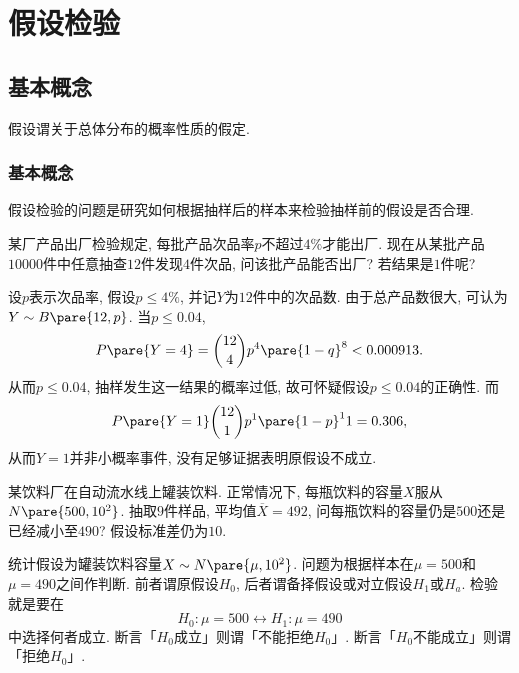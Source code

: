 \documentclass{ctexart}
\begin{document}
\section{假设检验} %
\label{sec:假设检验}

\subsection{基本概念} %
\label{sub:基本概念}

假设谓关于总体分布的概率性质的假定.

\subsubsection{基本概念} %
\label{ssub:基本概念}

假设检验的问题是研究如何根据抽样后的样本来检验抽样前的假设是否合理.
\begin{sample}
    \begin{ex}
        某厂产品出厂检验规定, 每批产品次品率$p$不超过$4\%$才能出厂. 现在从某批产品$10000$件中任意抽查$12$件发现$4$件次品, 问该批产品能否出厂? 若结果是$1$件呢?
    \end{ex}
    \begin{solution}
        设$p$表示次品率, 假设$p\le 4\%$, 并记$Y$为$12$件中的次品数. 由于总产品数很大, 可认为$Y\sim B\pare{12,p}$. 当$p\le 0.04$,
        \[ P\pare{Y=4} = \binom{12}{4} p^4\pare{1-q}^8 < 0.000913. \]
        从而$p\le 0.04$, 抽样发生这一结果的概率过低, 故可怀疑假设$p\le 0.04$的正确性. 而
        \[ P\pare{Y=1} \binom{12}{1}p^1\pare{1-p}^11 = 0.306, \]
        从而$Y=1$并非小概率事件, 没有足够证据表明原假设不成立.
    \end{solution}
\end{sample}
\begin{sample}
    \begin{ex}
        某饮料厂在自动流水线上罐装饮料. 正常情况下, 每瓶饮料的容量$X$服从$N\pare{500,10^2}$. 抽取$9$件样品, 平均值$\overbar{X} = 492$, 问每瓶饮料的容量仍是$500$还是已经减小至$490$? 假设标准差仍为$10$.
    \end{ex}
\end{sample}
统计假设为罐装饮料容量$X\sim N\pare{\mu,10^2}$. 问题为根据样本在$\mu=500$和$\mu=490$之间作判断. 前者谓原假设$H_0$, 后者谓备择假设或对立假设$H_1$或$H_a$. 检验就是要在
\[ H_0: \mu=500 \leftrightarrow H_1: \mu = 490 \]
中选择何者成立. 断言「$H_0$成立」则谓「不能拒绝$H_0$」. 断言「$H_0$不能成立」则谓「拒绝$H_0$」.



\end{document}

